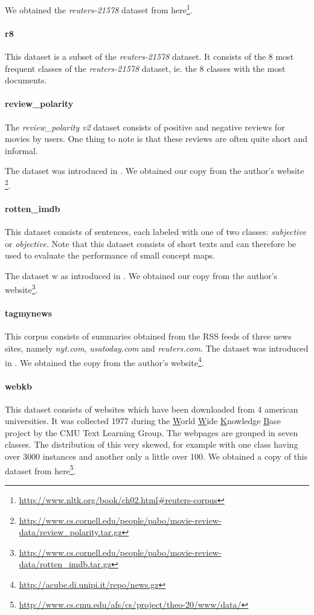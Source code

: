 We obtained the \textit{reuters-21578} dataset from here\footnote{\url{http://www.nltk.org/book/ch02.html\#reuters-corpus}}.

\paragraph{r8}
This dataset is a subset of the \textit{reuters-21578} dataset.
It consists of the 8 most frequent classes of the \textit{reuters-21578} dataset, ie. the 8 classes with the most documents.

\paragraph{review\_polarity}
The \textit{review\_polarity v2} dataset consists of positive and negative reviews for movies by users.
One thing to note is that these reviews are often quite short and informal.

The dataset was introduced in \cite{Pang2004}. We obtained our copy from the author's website \footnote{\url{http://www.cs.cornell.edu/people/pabo/movie-review-data/review\_polarity.tar.gz}}.

\paragraph{rotten\_imdb}
This dataset consists of sentences, each labeled with one of two classes: \textit{subjective} or \textit{objective}.
Note that this dataset consists of short texts and can therefore be used to evaluate the performance of small concept maps.

The dataset w as introduced in \cite{Pang2004}. We obtained our copy from the author's website\footnote{\url{http://www.cs.cornell.edu/people/pabo/movie-review-data/rotten\_imdb.tar.gz}}.

\paragraph{tagmynews}
This corpus consists of summaries obtained from the RSS feeds of three news sites, namely \textit{nyt.com}, \textit{usatoday.com} and \textit{reuters.com}.
The dataset was introduced in \cite{Vitale2012a}.
We obtained the copy from the author's website\footnote{\url{http://acube.di.unipi.it/repo/news.gz}}.	

\paragraph{webkb}
This dataset consists of websites which have been downloaded from 4 american universities. It was collected 1977 during the \underline{W}orld \underline{W}ide \underline{K}nowledge \underline{B}ase project by the CMU Text Learning Group.
The webpages are grouped in seven classes. The distribution of this very skewed, for example with one class having over 3000 instances and another only a little over 100.
We obtained a copy of this dataset from here\footnote{\url{http://www.cs.cmu.edu/afs/cs/project/theo-20/www/data/}}.

